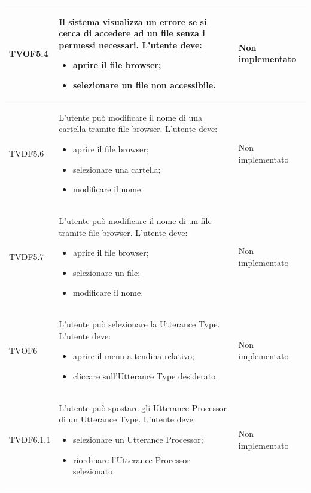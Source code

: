 \documentclass[openany,12pt,a4paper]{report}
\begin{document}
\begin{longtable}{| p{2cm} |p{5cm} | p{2.5cm} |}
	\newline TVOF5.4&
	\newline Il sistema visualizza un errore se si cerca di accedere ad un file senza i permessi necessari. L'utente deve:
	\begin{itemize}
		\item aprire il file browser;
		\item selezionare un file non accessibile.
	\end{itemize}&
	\newline Non implementato
	\\[1em]	
	\hline
	
	\newline TVDF5.6&
	\newline L'utente può modificare il nome di una cartella tramite file browser. L'utente deve:
	\begin{itemize}
		\item aprire il file browser;
		\item selezionare una cartella;
		\item modificare il nome.
	\end{itemize}&
	\newline Non implementato
	\\[1em]
	\hline
	\newline TVDF5.7&
	\newline L'utente può modificare il nome di un file tramite file browser. L'utente deve:
	\begin{itemize}
		\item aprire il file browser;
		\item selezionare un file;
		\item modificare il nome.
	\end{itemize}&
	\newline Non implementato
	\\[1em]
	\hline
	\newline TVOF6&
	\newline L'utente può selezionare la Utterance Type. L'utente deve:
	\begin{itemize}
		\item aprire il menu a tendina relativo;
		\item cliccare sull'Utterance Type desiderato.
	\end{itemize}&
	\newline Non implementato
	\\[1em]
	\hline
	
	\newline TVDF6.1.1&
	\newline L'utente può spostare gli Utterance Processor di un Utterance Type. L'utente deve:
	\begin{itemize}
		\item selezionare un Utterance Processor;
		\item riordinare l'Utterance Processor selezionato.
	\end{itemize}&
	\newline Non implementato
	\\[1em]
	\hline	
	

\end{longtable}
\end{document}

